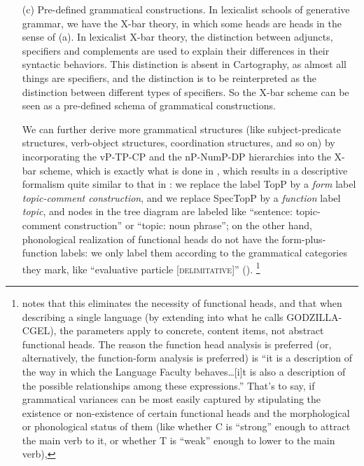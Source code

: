 \documentclass[UTF8, a4paper, oneside, scheme=plain, 12pt]{ctexrep}
\newcommand*{\term}[1]{\emph{#1}}
\newcommand*{\category}[1]{\textsc{#1}}
\begin{document}
{\begin{itemize}
    \item[(c)] Pre-defined grammatical constructions.
    In lexicalist schools of generative grammar,
    we have the X-bar theory, in which some heads are heads in the sense of (a).
    In lexicalist X-bar theory, the distinction between adjuncts, specifiers and complements
    are used to explain their differences in their syntactic behaviors.
    This distinction is absent in Cartography,
    as almost all things are specifiers, and the distinction is to be reinterpreted
    as the distinction between different types of specifiers.
    So the X-bar scheme can be seen as a pre-defined schema of grammatical constructions.
    
    We can further derive more grammatical structures 
    (like subject-predicate structures, verb-object structures, coordination structures, and so on)
    by incorporating the vP-TP-CP and the nP-NumP-DP hierarchies into the X-bar scheme,
    which is exactly what is done in \citet{deng2010formal},
    which results in a descriptive formalism quite similar to that in \citet{cgel}:
    we replace the label TopP by a \term{form} label \term{topic-comment construction},
    and we replace SpecTopP by a \term{function} label \term{topic},
    and nodes in the tree diagram are labeled like ``sentence: topic-comment construction''
    or ``topic: noun phrase'';
    on the other hand, phonological realization of functional heads
    do not have the form-plus-function labels:
    we only label them according to the grammatical categories they mark,
    like ``evaluative particle [\category{delimitative}]'' ().%
    \footnote{
        \citet{culicover2004cambridge} notes that this eliminates the necessity of functional heads,
        and that when describing a single language (by extending \citet{cgel} into what he calls GODZILLA-CGEL),
        the parameters apply to concrete, content items, not abstract functional heads.
        The reason the function head analysis is preferred (or, alternatively, the function-form analysis is preferred) is 
        ``it is a description of the way in which the Language Faculty behaves\dots [i]t is also a description of the possible relationships among these expressions.''
        That's to say, if grammatical variances can be most easily captured by
        stipulating the existence or non-existence of certain functional heads
        and the morphological or phonological status of them
        (like whether C is ``strong'' enough to attract the main verb to it,
        or whether T is ``weak'' enough to lower to the main verb),
}
\end{itemize}}
\end{document}

